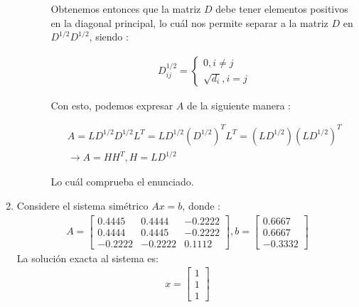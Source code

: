 \documentclass{article}
\begin{document}
\begin{enumerate}
\begin{itemize}
\begin{itemize}
Obtenemos entonces que la matriz $D$ debe tener elementos positivos en la diagonal principal, lo cu\'al nos permite separar a la matriz $D$ en $D^{1/2}D^{1/2}$, siendo :

\begin{gather*}
D^{1/2}_{ij} = 
	\begin{cases}
			0 		 , i \neq j\\
		\sqrt{d_{i}} , i=j
	\end{cases}
\end{gather*}

Con esto, podemos expresar $A$ de la siguiente manera :

\begin{gather*}
A = LD^{1/2}D^{1/2}L^{T} = LD^{1/2}( D^{1/2} )^{T}L^{T} = (LD^{1/2})(LD^{1/2})^{T} \\
\rightarrow A = HH^{T},H= LD^{1/2}
\end{gather*}

Lo cu\'al comprueba el enunciado.

\end{itemize}

\end{itemize}


\item Considere el sistema sim\'etrico $Ax=b$, donde :
\begin{gather*}
A = 
	\begin{bmatrix}
		0.4445 &  0.4444 & -0.2222\\
		0.4444 &  0.4445 & -0.2222\\
	   -0.2222 & -0.2222 &  0.1112
	\end{bmatrix},
b = 
	\begin{bmatrix}
		0.6667 \\
		0.6667 \\
	   -0.3332
	\end{bmatrix}
\end{gather*}
La soluci\'on exacta al sistema es:
\begin{gather*}
x = 
	\begin{bmatrix}
		1\\1\\1
	\end{bmatrix}
\end{gather*}


\end{enumerate}
\end{document}
